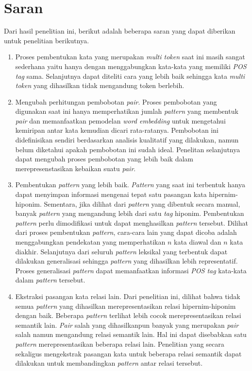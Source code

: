 \section{Saran}
Dari hasil penelitian ini, berikut adalah beberapa saran yang dapat diberikan untuk penelitian berikutnya.

\begin{enumerate}
  \item Proses pembentukan kata yang merupakan \textit{multi token} saat ini masih sangat sederhana yaitu hanya dengan menggabungkan kata-kata yang memiliki \textit{POS tag} sama. Selanjutnya dapat diteliti cara yang lebih baik sehingga kata \textit{multi token} yang dihasilkan tidak mengandung token berlebih.
  \item Mengubah perhitungan pembobotan \textit{pair}. Proses pembobotan yang digunakan saat ini hanya memperhatikan jumlah \textit{pattern} yang membentuk \textit{pair} dan memanfaatkan pemodelan \textit{word embedding} untuk mengetahui kemiripan antar kata kemudian dicari rata-ratanya. Pembobotan ini didefinisikan sendiri berdasarkan analisis kualitatif yang dilakukan, namun belum diketahui apakah pembobotan ini sudah ideal. Penelitan selanjutnya dapat mengubah proses pembobotan yang lebih baik dalam merepresenstasikan kebaikan suatu \textit{pair}.
  \item Pembentukan \textit{pattern} yang lebih baik. \textit{Pattern} yang saat ini terbentuk hanya dapat menyimpan informasi mengenai tepat satu pasangan kata hipernim-hiponim. Sementara, jika dilihat dari \textit{pattern} yang dibentuk secara manual, banyak \textit{pattern} yang mengandung lebih dari satu \textit{tag} hiponim. Pembentukan \textit{pattern} perlu dimodifikasi untuk dapat menghasilkan \textit{pattern} tersebut. Dilihat dari proses pembentukan \textit{pattern}, cara-cara lain yang dapat dicoba adalah menggabungkan pendekatan yang memperhatikan $n$ kata diawal dan $n$ kata diakhir. Selanjutnya dari seluruh \textit{pattern} leksikal yang terbentuk dapat dilakukan generalisasi sehingga \textit{pattern} yang dihasilkan lebih representatif. Proses generalisasi \textit{pattern} dapat memanfaatkan informasi \textit{POS tag} kata-kata dalam \textit{pattern} tersebut. 
  \item Ekstraksi pasangan kata relasi lain. Dari penelitian ini, dilihat bahwa tidak semua \textit{pattern} yang dihasilkan merepresentasikan relasi hipernim-hiponim dengan baik. Beberapa \textit{pattern} terlihat lebih cocok merepresentasikan relasi semantik lain. \textit{Pair} salah yang dihasilkanpun banyak yang merupakan \textit{pair} salah namun mengandung relasi semantik lain. Hal ini dapat disebabkan satu \textit{pattern} merepresentasikan beberapa relasi lain. Penelitian yang secara sekaligus mengekstrak pasangan kata untuk beberapa relasi semantik dapat dilakukan untuk membandingkan \textit{pattern} antar relasi tersebut.

\end{enumerate}
